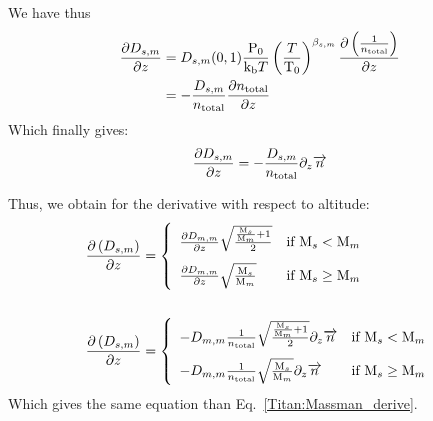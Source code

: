 We have thus
\begin{equation}
\begin{split}
\frac{\partial D_{s,m}}{\partial z} & = D_{s,m}(0,1) \frac{\mathrm{P_0}}{\text{k}_\text{b} T}\left(\frac{T}{\mathrm{T_0}}\right)^{\beta_{s,m}} \frac{\partial\left(\frac{1}{n_\text{total}}\right)}{\partial z}\\
                      & = -\frac{D_{s,m}}{n_\text{total}}\frac{\partial n_\text{total}}{\partial z}
\end{split}
\end{equation}
Which finally gives:
\begin{equation}
\frac{\partial D_{s,m}}{\partial z}  = -\frac{D_{s,m}}{n_\text{total}}\partial_{z}{\overrightarrow{n}}
\label{Titan:Massman_derive}
\end{equation}

Thus, we obtain for the derivative with respect to altitude:
\begin{equation}
\begin{split}
\renewcommand{\arraystretch}{2}
\dOverdz{\diff_{s,m}} & =
\left\{\begin{array}{l@{\quad}r}
\doverdz{\diff_{m,m}}\sqrt{\frac{\frac{\Mm_s}{\Mm_m} + 1}{2}}  & \text{if } \Mm_s < \Mm_m    \\
\doverdz{\diff_{m,m}}\sqrt{\frac{\Mm_s}{\Mm_m}}                & \text{if } \Mm_s \geq \Mm_m \\
\end{array}\right. 
\\\\
\dOverdz{\diff_{s,m}} & =
\left\{\begin{array}{l@{\quad}r}
-\diff_{m,m}\frac{1}{\concAtm}\sqrt{\frac{\frac{\Mm_s}{\Mm_m} + 1}{2}}\divergez{\conc}  & \text{if } \Mm_s < \Mm_m    \\
-\diff_{m,m}\frac{1}{\concAtm}\sqrt{\frac{\Mm_s}{\Mm_m}}\divergez{\conc}                & \text{if } \Mm_s \geq \Mm_m \\
\end{array}\right. 
\end{split}
\label{Titan:diffusion_no_data_derive}
\end{equation}
Which gives the same equation than Eq.~\ref{Titan:Massman_derive}.

